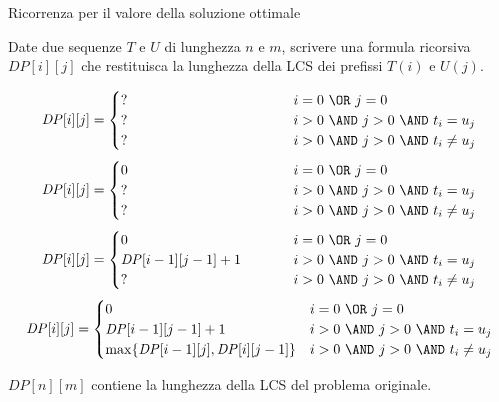 \begin{frame}{Ricorrenza per il \alert{valore} della soluzione ottimale}

\vspace{-9pt}
\begin{myboxtitle}
Date due sequenze $T$ e $U$ di lunghezza $n$ e $m$, scrivere una formula
ricorsiva $\mathit{DP}[i][j]$ che restituisca la \alert{lunghezza} della LCS dei prefissi $T(i)$ e $U(j)$.
\end{myboxtitle}

\begingroup
\small
\begin{overprint}
\[
  \mathit{DP}[i][j] = \begin{cases}
   \makebox[4cm][l]{?} & i=0\ \OR\ j=0 \\
   \makebox[4cm][l]{?} & i>0\ \AND\ j>0\ \AND\ t_i = u_j \\
   \makebox[4cm][l]{?} & i>0\ \AND\ j>0\ \AND\ t_i \neq u_j
  \end{cases}
\]
\[
  \mathit{DP}[i][j] = \begin{cases}
   0 & i=0\ \OR\ j=0 \\
   \makebox[4cm][l]{?} & i>0\ \AND\ j>0\ \AND\ t_i = u_j \\
   \makebox[4cm][l]{?} & i>0\ \AND\ j>0\ \AND\ t_i \neq u_j
  \end{cases}
\]
\[
  \mathit{DP}[i][j] = \begin{cases}
   0 & i=0\ \OR\ j=0 \\
   \mathit{DP}[i-1][j-1]+1 & i>0\ \AND\ j>0\ \AND\ t_i = u_j \\
   \makebox[4cm][l]{?} & i>0\ \AND\ j>0\ \AND\ t_i \neq u_j
  \end{cases}
\]
\[
  \mathit{DP}[i][j] = \begin{cases}
   0 & i=0\ \OR\ j=0 \\
   \mathit{DP}[i-1][j-1]+1 & i>0\ \AND\ j>0\ \AND\ t_i = u_j \\
   \max \{ \mathit{DP}[i-1][j], \mathit{DP}[i][j-1] \} & i>0\ \AND\ j>0\ \AND\ t_i \neq u_j
  \end{cases}
\]
\end{overprint}
\endgroup

\bigskip
{}

\smallskip
$\mathit{DP}[n][m]$ contiene la lunghezza della LCS del problema originale.

\end{frame}

